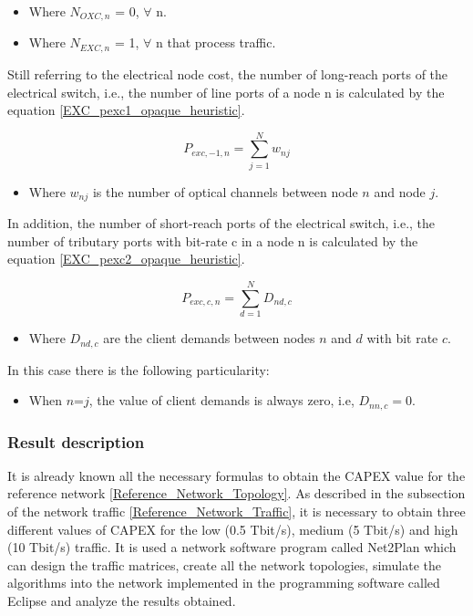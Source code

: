 \begin{itemize}
  \item Where $N_{OXC,n}$ = 0, \quad $\forall$ n.
  \item Where $N_{EXC,n}$ = 1, \quad $\forall$ n that process traffic.
\end{itemize}

Still referring to the electrical node cost, the number of long-reach ports of the electrical switch, i.e., the number of line ports of a node n is calculated by the equation \ref{EXC_pexc1_opaque_heuristic}.

\begin{equation}
P_{exc,-1,n} = \sum_{j=1}^{N} w_{nj}
\label{EXC_pexc1_opaque_heuristic}
\end{equation}

\begin{itemize}
\item Where {$w_{nj}$ is the number of optical channels between node $n$ and node $j$}.
\end{itemize}

\newpage
\vspace{11pt}
In addition, the number of short-reach ports of the electrical switch, i.e., the number of tributary ports with bit-rate c in a node n is calculated by the equation \ref{EXC_pexc2_opaque_heuristic}.

\begin{equation}
P_{exc,c,n} = \sum_{d=1}^{N} D_{nd,c}
\label{EXC_pexc2_opaque_heuristic}
\end{equation}

\begin{itemize}
  \item Where {$D_{nd,c}$ are the client demands between nodes $n$ and $d$ with bit rate $c$}.
\end{itemize}

\vspace{11pt}
In this case there is the following particularity:

\begin{itemize}
  \item When $n$=$j$, the value of client demands is always zero, i.e, $D_{nn,c}=0$.
\end{itemize}

\subsubsection{Result description}

It is already known all the necessary formulas to obtain the CAPEX value for the reference network \ref{Reference_Network_Topology}. As described in the subsection of the network traffic \ref{Reference_Network_Traffic}, it is necessary to obtain three different values of CAPEX for the low (0.5 Tbit/s), medium (5 Tbit/s) and high (10 Tbit/s) traffic. It is used a network software program called Net2Plan which can design the traffic matrices, create all the network topologies, simulate the algorithms into the network implemented in the programming software called Eclipse and analyze the results obtained.\\

